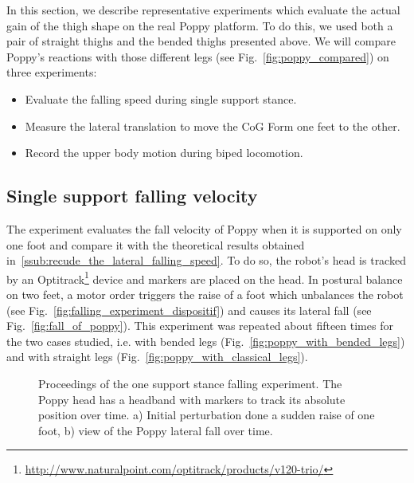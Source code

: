 In this section, we describe representative experiments which evaluate the actual gain of the thigh
shape on the real Poppy platform. To do this, we used both a pair of straight thighs and the bended
thighs presented above. We will compare Poppy's reactions with those different legs (see
Fig.~\ref{fig:poppy_compared}) on three experiments:
\begin{itemize}
    \item Evaluate the falling speed during single support stance.
    \item Measure the lateral translation to move the CoG Form one feet to the other.
    \item Record the upper body motion during biped locomotion.
\end{itemize}

\subsection{Single support falling velocity} %
\label{sub:falling_velocity}
The experiment evaluates the fall velocity of Poppy when it is supported on only one foot and compare it with the theoretical results obtained in~\ref{ssub:recude_the_lateral_falling_speed}. To do so, the robot's head is tracked by an Optitrack\footnote{\url{http://www.naturalpoint.com/optitrack/products/v120-trio/}} device and markers are placed on the head. In postural balance on two feet, a motor order triggers the raise of a foot which unbalances the robot (see Fig.~\ref{fig:falling_experiment_dispositif}) and causes its lateral fall (see Fig.~\ref{fig:fall_of_poppy}). This experiment was repeated about fifteen times for the two cases studied, i.e. with bended legs (Fig.~\ref{fig:poppy_with_bended_legs}) and with straight legs (Fig.~\ref{fig:poppy_with_classical_legs}).

\begin{figure}[h]
\centering
    \hfil
    \caption{Proceedings of the one support stance falling experiment. The Poppy head has a headband with markers to track its absolute position over time.  a) Initial perturbation done a sudden raise of one foot, b) view of the Poppy lateral fall over time.}
    \label{fig:falling_experiment}
\end{figure}

